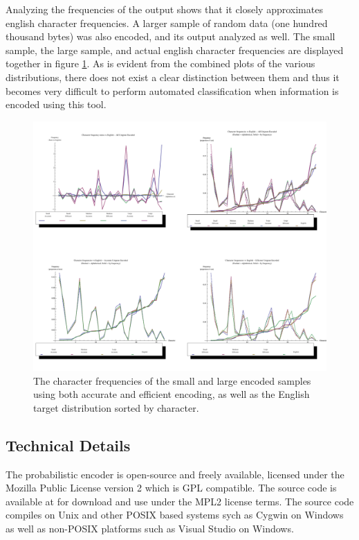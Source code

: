 \documentclass[12pt]{report}
\theoremstyle{remark}
\theoremstyle{definition}
\theoremstyle{definition}
\theoremstyle{definition}
\begin{document}
\begin{appendices}
Analyzing the frequencies of the output shows that it closely approximates
english character frequencies. A larger sample of random data (one hundred
thousand bytes) was also encoded, and its output analyzed as well. The small
sample, the large sample, and actual english character frequencies are displayed
together in figure \ref{FIGURE_frequencies-bytop}. As is evident from the combined plots of the
various distributions, there does not exist a clear distinction between them and
thus it becomes very difficult to perform automated classification when
information is encoded using this tool.

\begin{landscape}
\begin{figure}
\centering
\includegraphics[width=1.15\textwidth]{figures/plots_unigram.pdf}
\caption[Plot of Character Frequencies]{The character frequencies of the small and large encoded samples using both accurate and efficient encoding, as well as the English target distribution sorted by character.}
\label{FIGURE_frequencies-bytop}
\end{figure}
\end{landscape}

\subsection{Technical Details} The probabilistic encoder is open-source and
freely available, licensed under the Mozilla Public License version 2 which is
GPL compatible. The source code is available at \cite{probcodesrc} for download
and use under the MPL2 license terms. The source code compiles on Unix and other
POSIX based systems sych as Cygwin on Windows as well as non-POSIX platforms such as Visual Studio on Windows.


\end{appendices}
\end{document}
